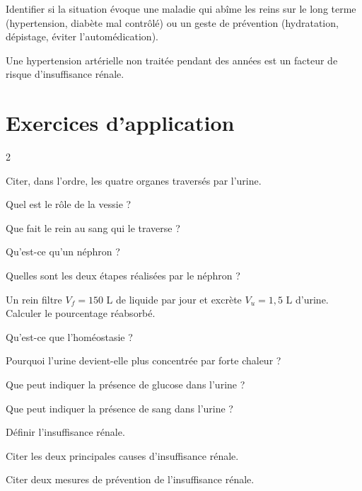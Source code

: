 Identifier si la situation évoque une maladie qui abîme les reins sur le long terme
(hypertension, diabète mal contrôlé) ou un geste de prévention (hydratation,
dépistage, éviter l'automédication).
\begin{exemple}
Une hypertension artérielle non traitée pendant des années est un facteur de risque
d'insuffisance rénale.
\end{exemple}

\section{Exercices d'application}
\begin{multicols}{2}

\exo{} Citer, dans l'ordre, les quatre organes traversés par l'urine.

\exo{} Quel est le rôle de la vessie ?

\exo{} Que fait le rein au sang qui le traverse ?

\exo{} Qu'est-ce qu'un néphron ?

\exo{} Quelles sont les deux étapes réalisées par le néphron ?

\exo{} Un rein filtre $V_f=150$ L de liquide par jour et excrète $V_u=1{,}5$ L
d'urine. Calculer le pourcentage réabsorbé.

\exo{} Qu'est-ce que l'homéostasie ?

\exo{} Pourquoi l'urine devient-elle plus concentrée par forte chaleur ?

\exo{} Que peut indiquer la présence de glucose dans l'urine ?

\exo{} Que peut indiquer la présence de sang dans l'urine ?

\exo{} Définir l'insuffisance rénale.

\exo{} Citer les deux principales causes d'insuffisance rénale.

\exo{} Citer deux mesures de prévention de l'insuffisance rénale.

\end{multicols}

